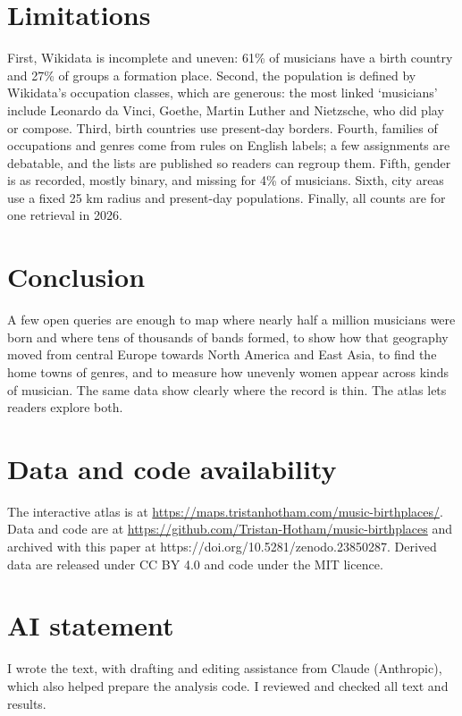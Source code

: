 \documentclass[11pt,a4paper]{article}
\begin{document}
\section{Limitations}
First, Wikidata is incomplete and uneven: 61\% of musicians have a birth country and 27\% of groups a formation place. Second, the population is defined by Wikidata's occupation classes, which are generous: the most linked `musicians' include Leonardo da Vinci, Goethe, Martin Luther and Nietzsche, who did play or compose. Third, birth countries use present-day borders. Fourth, families of occupations and genres come from rules on English labels; a few assignments are debatable, and the lists are published so readers can regroup them. Fifth, gender is as recorded, mostly binary, and missing for 4\% of musicians. Sixth, city areas use a fixed 25 km radius and present-day populations. Finally, all counts are for one retrieval in 2026.

\section{Conclusion}
A few open queries are enough to map where nearly half a million musicians were born and where tens of thousands of bands formed, to show how that geography moved from central Europe towards North America and East Asia, to find the home towns of genres, and to measure how unevenly women appear across kinds of musician. The same data show clearly where the record is thin. The atlas lets readers explore both.

\section*{Data and code availability}
The interactive atlas is at \url{https://maps.tristanhotham.com/music-birthplaces/}. Data and code are at \url{https://github.com/Tristan-Hotham/music-birthplaces} and archived with this paper at https://doi.org/10.5281/zenodo.23850287. Derived data are released under CC BY 4.0 and code under the MIT licence.

\section*{AI statement}
I wrote the text, with drafting and editing assistance from Claude (Anthropic), which also helped prepare the analysis code. I reviewed and checked all text and results.
\end{document}

